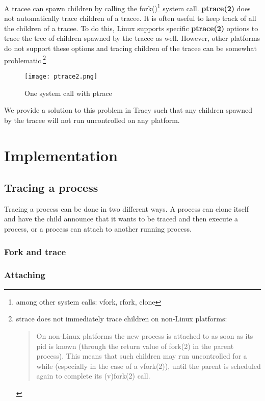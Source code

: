 \documentclass[a4paper, twoside, 10pt, twocolumn]{report}
\begin{document}
A tracee can spawn children by calling the fork()\footnote{among other system
calls: vfork, rfork, clone} system call. \textbf{ptrace(2)} does not
automatically trace children of a tracee. It is often useful to keep track of
all the children of a tracee. To do this, Linux supports specific
\textbf{ptrace(2)} options to trace the tree of children spawned by the tracee
as well. However, other platforms do not support these options and tracing
children of the tracee can be somewhat problematic.\footnote{strace does not
immediately trace children on non-Linux platforms:
\begin{quote}
    On non-Linux platforms the new process is attached to as soon as its pid is
    known (through the return value of fork(2) in the parent process).
    This means that such children may run uncontrolled for a while
    (especially in the case of a vfork(2)), until the parent is scheduled
    again to complete its (v)fork(2)  call.
\end{quote}
}

\begin{figure}
\label{fig2}
\texttt{[image: ptrace2.png]}
\caption{One system call with ptrace}
\end{figure}

We provide a solution to this problem in Tracy such that any children spawned
by the tracee will not run uncontrolled on any platform.

\chapter{Implementation}

\section{Tracing a process}

Tracing a process can be done in two different ways. A process can clone itself
and have the child announce that it wants to be traced and then execute a
process, or a process can attach to another running process.

\subsection{Fork and trace}

\subsection{Attaching}
\end{document}
